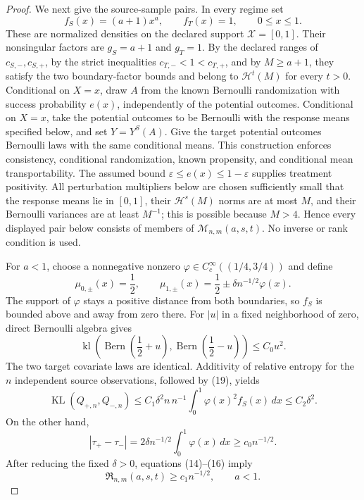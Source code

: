 \documentclass{article}
\begin{document}
\begin{proof}
We next give the source-sample pairs.  In every regime set
\[
 f_S(x)=(a+1)x^a,
 \qquad
 f_T(x)=1,
 \qquad 0\leq x\leq1.
 \tag{17}
\]
These are normalized densities on the declared support \(\mathcal X=[0,1]\).  Their nonsingular factors are \(g_S=a+1\) and \(g_T=1\).  By the declared ranges of \(c_{S,-},c_{S,+}\), by the strict inequalities \(c_{T,-}<1<c_{T,+}\), and by \(M\geq a+1\), they satisfy the two boundary-factor bounds and belong to \(\mathcal H^t(M)\) for every \(t>0\).  Conditional on \(X=x\), draw \(A\) from the known Bernoulli randomization with success probability \(e(x)\), independently of the potential outcomes.  Conditional on \(X=x\), take the potential outcomes to be Bernoulli with the response means specified below, and set \(Y=Y^S(A)\).  Give the target potential outcomes Bernoulli laws with the same conditional means.  This construction enforces consistency, conditional randomization, known propensity, and conditional mean transportability.  The assumed bound \(\varepsilon\leq e(x)\leq1-\varepsilon\) supplies treatment positivity.  All perturbation multipliers below are chosen sufficiently small that the response means lie in \([0,1]\), their \(\mathcal H^s(M)\) norms are at most \(M\), and their Bernoulli variances are at least \(M^{-1}\); this is possible because \(M>4\).  Hence every displayed pair below consists of members of \(\mathcal M_{n,m}(a,s,t)\).  No inverse or rank condition is used.

For \(a<1\), choose a nonnegative nonzero \(\varphi\in C_c^\infty((1/4,3/4))\) and define
\[
 \mu_{0,\pm}(x)=\frac12,
 \qquad
 \mu_{1,\pm}(x)=\frac12\pm\delta n^{-1/2}\varphi(x).
 \tag{18}
\]
The support of \(\varphi\) stays a positive distance from both boundaries, so \(f_S\) is bounded above and away from zero there.  For \(|u|\) in a fixed neighborhood of zero, direct Bernoulli algebra gives
\[
 \operatorname{kl}\!\left(\operatorname{Bern}\!\left(\frac12+u\right),
 \operatorname{Bern}\!\left(\frac12-u\right)\right)\leq C_0u^2.
 \tag{19}
\]
The two target covariate laws are identical.  Additivity of relative entropy for the \(n\) independent source observations, followed by (19), yields
\[
 \operatorname{KL}(Q_{+,n},Q_{-,n})
 \leq C_1\delta^2 n\,n^{-1}\int_0^1\varphi(x)^2f_S(x)\,dx
 \leq C_2\delta^2.
 \tag{20}
\]
On the other hand,
\[
 |\tau_+-\tau_-|
 =2\delta n^{-1/2}\int_0^1\varphi(x)\,dx
 \geq c_0n^{-1/2}.
 \tag{21}
\]
After reducing the fixed \(\delta>0\), equations (14)--(16) imply
\[
 \mathfrak R_{n,m}(a,s,t)\geq c_1n^{-1/2},
 \qquad a<1.
 \tag{22}
\]


\end{proof}
\end{document}

